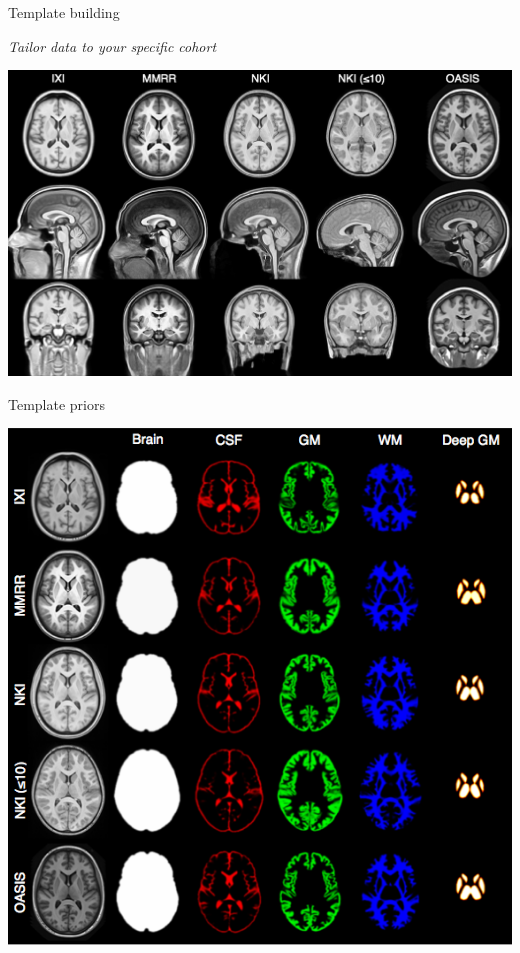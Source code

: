 \documentclass[ignorenonframetext,]{beamer}
\begin{document}
\begin{frame}{Template building}

\emph{Tailor data to your specific cohort}

\includegraphics{./evaluation/figures/templates.png}

\end{frame}

\begin{frame}{Template priors}

\includegraphics{./evaluation/figures/templatePriors.png}

\end{frame}
\end{document}
